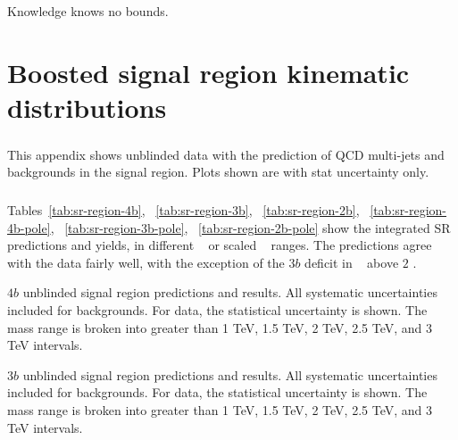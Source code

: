 \begin{savequote}[75mm]
Knowledge knows no bounds. 
\end{savequote}
\chapter{Boosted signal region kinematic distributions}
\label{AppendixSR}

\paragraph{}
This appendix shows unblinded data with the prediction of QCD multi-jets and \ttbar~ backgrounds in the signal region. Plots shown are with stat uncertainty only.

\paragraph{}
Tables~\ref{tab:sr-region-4b}, ~\ref{tab:sr-region-3b}, ~\ref{tab:sr-region-2b}, ~\ref{tab:sr-region-4b-pole}, ~\ref{tab:sr-region-3b-pole}, ~\ref{tab:sr-region-2b-pole} show the integrated SR predictions and yields, in different \mtwoJ~ or scaled \mtwoJ~ ranges. The predictions agree with the data fairly well, with the exception of the $3b$ deficit in \mtwoJ~ above $2$ \TeV.

\begin{table}[htb!]
\scriptsize
\begin{center}
\caption{$4b$ unblinded signal region predictions and results. All systematic uncertainties included for backgrounds. For data, the statistical uncertainty is shown. The mass range is broken into greater than 1 TeV, 1.5 TeV, 2 TeV, 2.5 TeV, and 3 TeV intervals.}

\label{tab:sr-region-4b}
\end{center}
\end{table}

\begin{table}[htb!]
\scriptsize
\begin{center}
\caption{$3b$ unblinded signal region predictions and results. All systematic uncertainties included for backgrounds. For data, the statistical uncertainty is shown. The mass range is broken into greater than 1 TeV, 1.5 TeV, 2 TeV, 2.5 TeV, and 3 TeV intervals.}

\label{tab:sr-region-3b}
\end{center}
\end{table}

